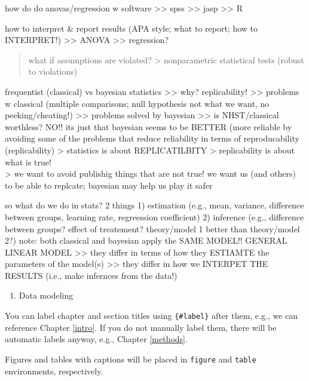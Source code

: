 \documentclass[
]{book}
\providecommand{\tightlist}{%
  \setlength{\itemsep}{0pt}\setlength{\parskip}{0pt}}
\begin{document}
how do do anovas/regression w software
\textgreater\textgreater{} spss
\textgreater\textgreater{} jasp
\textgreater\textgreater{} R

how to interpret \& report results (APA style; what to report; how to INTERPRET!)
\textgreater\textgreater{} ANOVA
\textgreater\textgreater{} regression?

\begin{quote}
what if assumptions are violated?
\textgreater{} nonparametric statistical tests (robust to violations)
\end{quote}

frequentist (classical) vs bayesian statistics
\textgreater\textgreater{} why? replicability!
\textgreater\textgreater{} problems w classical (multiple comparisons; null hypothesis not what we want, no peeking/cheating!)
\textgreater\textgreater{} problems solved by bayesian
\textgreater\textgreater{} is NHST/classical worthless? NO!! its just that bayesian seems to be BETTER (more reliable by avoiding some of the problems that reduce reliability in terms of reproducability (replicability)
\textgreater{} statistics is about REPLICATILBITY
\textgreater{} replicability is about what is true!\\
\textgreater{} we want to avoid publishig things that are not true! we want us (and others) to be able to replcate; bayesian may help us play it safer

so what do we do in stats? 2 things
1) estimation (e.g., mean, variance, difference between groups, learning rate, regreession coefficient)
2) inference (e.g., difference between groups? effect of treatement? theory/model 1 better than theory/model 2?)
note: both classical and bayesian apply the SAME MODEL!! GENERAL LINEAR MODEL
\textgreater\textgreater{} they differ in terms of how they ESTIAMTE the parameters of the model(s)
\textgreater\textgreater{} they differ in how we INTERPET THE RESULTS (i.e., make infernces from the data!)

\begin{enumerate}
\def\labelenumi{\arabic{enumi})}
\setcounter{enumi}{4}
\tightlist
\item
  Data modeling
\end{enumerate}

You can label chapter and section titles using \texttt{\{\#label\}} after them, e.g., we can reference Chapter \ref{intro}. If you do not manually label them, there will be automatic labels anyway, e.g., Chapter \ref{methods}.

Figures and tables with captions will be placed in \texttt{figure} and \texttt{table} environments, respectively.
\end{document}
